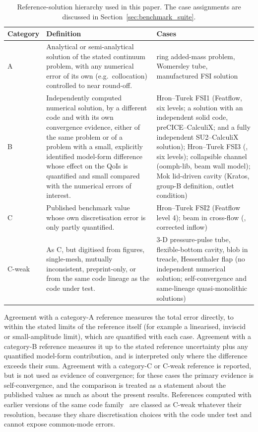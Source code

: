 \begin{table}[htbp]
	\centering
	\small
	\setlength{\tabcolsep}{4pt}
	\caption{Reference-solution hierarchy used in this paper. The case assignments are discussed in Section~\ref{sec:benchmark_suite}.}
	\label{tab:ref_hierarchy}
	\begin{tabular}{p{1.4cm}p{7.0cm}p{5.0cm}}
		\toprule
		Category & Definition & Cases \\
		\midrule
		A & Analytical or semi-analytical solution of the stated continuum problem, with any numerical error of its own (e.g.\ collocation) controlled to near round-off. & ring added-mass problem, Womersley tube, manufactured FSI solution \\
		B & Independently computed numerical solution, by a different code and with its own convergence evidence, either of the same problem or of a problem with a small, explicitly identified model-form difference whose effect on the QoIs is quantified and small compared with the numerical errors of interest. & Hron--Turek FSI1 (Featflow, six levels; a solution with an independent solid code, preCICE--CalculiX; and a fully independent SU2--CalculiX solution); Hron--Turek FSI3 (\citet{Failer2020}, six levels); collapsible channel (oomph-lib, beam wall model); Mok lid-driven cavity (Kratos, group-B definition, outlet condition) \\
		C & Published benchmark value whose own discretisation error is only partly quantified. & Hron--Turek FSI2 (Featflow level 4); beam in cross-flow (\citet{Richter2012}, corrected inflow) \\
		C-weak & As C, but digitised from figures, single-mesh, mutually inconsistent, preprint-only, or from the same code lineage as the code under test. & 3-D pressure-pulse tube, flexible-bottom cavity, blob in treacle, Hessenthaler flap (no independent numerical solution; self-convergence and same-lineage quasi-monolithic solutions) \\
		\bottomrule
	\end{tabular}
\end{table}

Agreement with a category-A reference measures the total error directly, to within the stated limits of the reference itself (for example a linearised, inviscid or small-amplitude limit), which are quantified with each case.
Agreement with a category-B reference measures it up to the stated reference uncertainty plus any quantified model-form contribution, and is interpreted only where the difference exceeds their sum.
Agreement with a category-C or C-weak reference is reported, but is not used as evidence of convergence; for these cases the primary evidence is self-convergence, and the comparison is treated as a statement about the published values as much as about the present results.
References computed with earlier versions of the same code family~\citep{Tukovic2018} are classed as C-weak whatever their resolution, because they share discretisation choices with the code under test and cannot expose common-mode errors.

